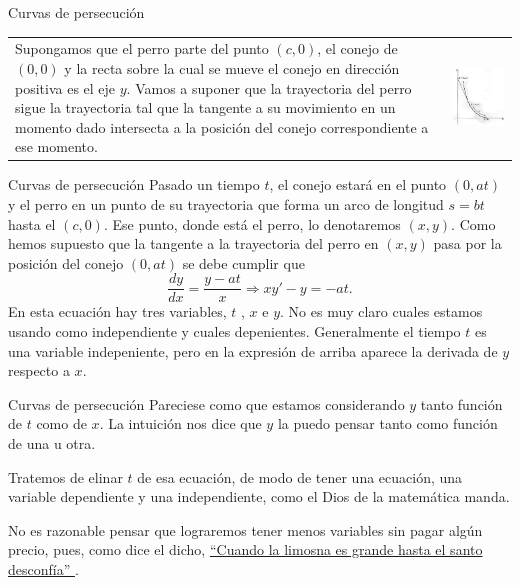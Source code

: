 \documentclass[handout,hyperref={colorlinks=true}]{beamer}
\begin{document}
\begin{frame}{Curvas de persecución}
 \begin{tabular}{m{4.5cm} m{5cm}}
Supongamos que el perro parte del punto $(c,0)$, el conejo de $(0,0 )$ y la recta sobre la cual se mueve el conejo en dirección positiva  es el eje $y$. 
Vamos a suponer que la trayectoria del perro sigue la trayectoria tal que 
la tangente a su movimiento en un momento dado intersecta a la posición del conejo correspondiente a ese momento.
& \includegraphics[scale=.4]{imagenes/persecucion.jpg}
\end{tabular}
\end{frame}


\begin{frame}{Curvas de persecución}
Pasado un tiempo $t$, el conejo estará en el punto $(0,at)$ y el perro en un punto de su trayectoria que forma un arco de
 longitud $s=bt$ hasta el $(c,0)$. Ese punto, donde está el perro, lo denotaremos $(x,y)$. Como hemos supuesto que la tangente a la trayectoria del perro en $(x,y)$ pasa 
 por la posición del conejo $(0,at)$ se debe cumplir que
 \begin{equation}\label{eq:persec}\frac{dy}{dx}=\frac{y-at}{x}\Longrightarrow xy'-y=-at.\end{equation}
 En esta ecuación hay tres variables, $t$ , $x$ e $y$. No es muy claro cuales estamos usando como independiente y cuales depenientes. 
 Generalmente el tiempo $t$ es una variable  indepeniente, pero en la expresión de arriba aparece la derivada de $y$ respecto a $x$. 
\end{frame}

\begin{frame}{Curvas de persecución}
  Pareciese como 
 que estamos considerando   $y$ tanto función de $t$ como de $x$. La intuición nos dice que $y$ la puedo pensar tanto como función de una u otra.
 
 Tratemos de elinar $t$ de esa ecuación, de modo de tener una ecuación, una variable dependiente y una independiente, como el Dios de la matemática manda.
 
  No es razonable pensar que lograremos tener menos variables sin pagar algún precio, pues, como dice el dicho, 
 \href{http://es.answers.yahoo.com/question/index?qid=20081023132736AABMX0}{``Cuando la limosna es grande hasta el santo desconfía'' }. 
\end{frame}
\end{document}
